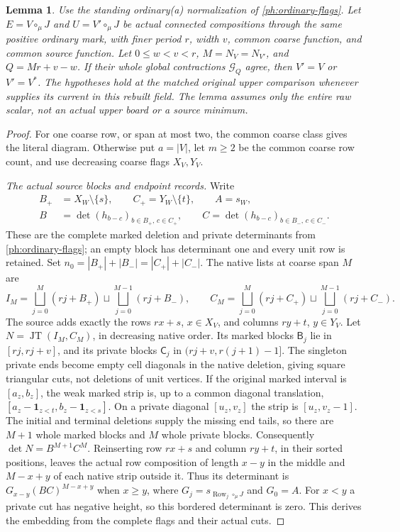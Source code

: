 \documentclass[11pt,a4paper]{amsart}
\numberwithin{equation}{section}
\theoremstyle{plain}
\newtheorem{lemma}[theorem]{Lemma}
\theoremstyle{definition}
\newcommand{\one}{\mathbf1}
\newcommand{\Row}{\operatorname{Row}}
\newcommand{\JT}{\operatorname{JT}}
\begin{document}
\begin{lemma}\label{rt:principal-star}
Use the standing ordinary(a) normalization of
\eqref{ph:ordinary-flags}.  Let \(E=V\circ_\mu J\) and
\(U=V'\circ_\mu J\) be actual connected compositions through the
same positive ordinary mark, with finer period \(r\), width \(v\),
common coarse function, and common source function.
Let \(0\le w<v<r\), \(M=N_V=N_{V'}\), and \(Q=Mr+v-w\).
If their whole global contractions \(\mathcal G_Q\) agree, then
\(V'=V\) or \(V'=V^*\).
The hypotheses hold at the matched original upper comparison whenever
 supplies its current in this rebuilt field.
The lemma assumes only the entire raw scalar, not an actual upper
board or a source minimum.
\end{lemma}
\begin{proof}
For one coarse row, or span at most two, the common coarse class gives
the literal diagram.  Otherwise put \(a=|V|\), let \(m\ge2\) be the
common coarse row count, and use decreasing coarse flags \(X_V,Y_V\).

\smallskip\noindent\emph{The actual source blocks and endpoint records.}
Write
\[
 \begin{aligned}
 B_+&=X_W\setminus\{s\},\qquad
 C_+=Y_W\setminus\{t\},\qquad A=s_W,\\
 B&=\det(h_{b-c})_{b\in B_+,\,c\in C_+},\qquad
 C=\det(h_{b-c})_{b\in B_-,\,c\in C_-}.
 \end{aligned}
\]
These are the complete marked deletion and private determinants from
\eqref{ph:ordinary-flags}; an empty block has determinant one and
every unit row is retained.  Set
\(n_0=|B_+|+|B_-|=|C_+|+|C_-|\).
The native lists at coarse span \(M\) are
\[
 I_M=\bigsqcup_{j=0}^{M}(rj+B_+)
       \sqcup\bigsqcup_{j=0}^{M-1}(rj+B_-),\qquad
 C_M=\bigsqcup_{j=0}^{M}(rj+C_+)
       \sqcup\bigsqcup_{j=0}^{M-1}(rj+C_-).
\]
The source adds exactly the rows \(rx+s\), \(x\in X_V\), and
columns \(ry+t\), \(y\in Y_V\).
Let \(N=\JT(I_M,C_M)\), in decreasing native order.
Its marked blocks \(\mathsf B_j\) lie in \([rj,rj+v]\), and its
private blocks \(\mathsf C_j\) in \((rj+v,r(j+1)-1]\).
The singleton private ends become empty cell diagonals in the native
deletion, giving square triangular cuts, not deletions of unit vertices.
If the original marked interval is \([a_z,b_z]\), the weak marked
strip is, up to a common diagonal translation,
\([a_z-\one_{z<t},b_z-\one_{z<s}]\).  On a private diagonal
\([u_z,v_z]\) the strip is \([u_z,v_z-1]\).
The initial and terminal deletions supply the missing end tails, so
there are \(M+1\) whole marked blocks and \(M\) whole private blocks.
Consequently \(\det N=B^{M+1}C^M\).
Reinserting row \(rx+s\) and column \(ry+t\), in their sorted
positions, leaves the actual row composition of length \(x-y\) in
the middle and \(M-x+y\) of each native strip outside it.  Thus its
determinant is \(G_{x-y}(BC)^{M-x+y}\) when \(x\ge y\), where
\(G_j=s_{\Row_j\circ_\mu J}\) and \(G_0=A\).
For \(x<y\) a private cut has negative height, so this bordered
determinant is zero.  This derives the embedding from the complete
flags and their actual cuts.


\end{proof}
\end{document}
